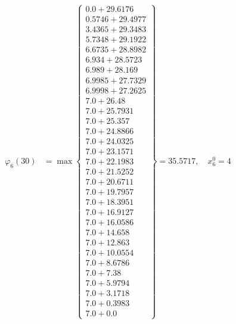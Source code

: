 \documentclass{article}
\begin{document}
\begin{align*}
  
\varphi_{6}(30) &= \max \left\{ \begin{array}{c}
0.0 + 29.6176 \\
 0.5746 + 29.4977 \\
 3.4365 + 29.3483 \\
 5.7348 + 29.1922 \\
 6.6735 + 28.8982 \\
 6.934 + 28.5723 \\
 6.989 + 28.169 \\
 6.9985 + 27.7329 \\
 6.9998 + 27.2625 \\
 7.0 + 26.48 \\
 7.0 + 25.7931 \\
 7.0 + 25.357 \\
 7.0 + 24.8866 \\
 7.0 + 24.0325 \\
 7.0 + 23.1571 \\
 7.0 + 22.1983 \\
 7.0 + 21.5252 \\
 7.0 + 20.6711 \\
 7.0 + 19.7957 \\
 7.0 + 18.3951 \\
 7.0 + 16.9127 \\
 7.0 + 16.0586 \\
 7.0 + 14.658 \\
 7.0 + 12.863 \\
 7.0 + 10.0554 \\
 7.0 + 8.6786 \\
 7.0 + 7.38 \\
 7.0 + 5.9794 \\
 7.0 + 3.1718 \\
 7.0 + 0.3983 \\
 7.0 + 0.0
\end{array} \right\}=35.5717,\quad x_{6}^0=4\\
  
  
  

\end{align*}
\end{document}
